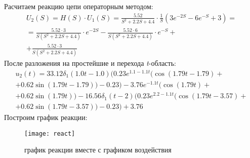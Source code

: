 \documentclass[a4paper,14pt ]{article} %
\begin{document}
    Расчитаем реакцию цепи операторным методом:
    \begin{multline}
        U_2(S) = H(S)\cdot U_1(S) =  \frac{5.52}{S^2 + 2.2S+ 4.4}
        \cdot \frac{1}{S}\left(3e^{-2S} - 6e^{-S} + 3\right) = \\
        = \frac{5.52\cdot3}{S(S^2 + 2.2S+ 4.4)}\cdot e^{-2S} -
        \frac{5.52\cdot6}{S(S^2 + 2.2S+ 4.4)}\cdot e^{-S} + \\
        + \frac{5.52\cdot3}{S(S^2 + 2.2S+ 4.4)}
    \end{multline}
    После разложения на простейшие и перехода {\it t}-область:
    \begin{multline}
        u_2(t) = 33.12\delta_1(1.0t - 1.0)
        (0.23e^{1.1 - 1.1t}(\cos(1.79t - 1.79) + \\
        + 0.62\sin(1.79t - 1.79)) - 0.23) - 
        3.76e^{-1.1t}(\cos(1.79t) + \\
        + 0.62\sin(1.79t)) - 16.56\delta_1(t - 2)(0.23e^{2.2 - 1.1t}
        (\cos(1.79t - 3.57) + \\
        + 0.62\sin(1.79t - 3.57)) - 
        0.23) + 3.76
    \end{multline}
    Построим график реакции:
    \begin{figure}[H]
        \texttt{[image: react]}
        \centering
        \caption{график реакции вместе с графиком воздействия}
    \end{figure}
\end{document}
